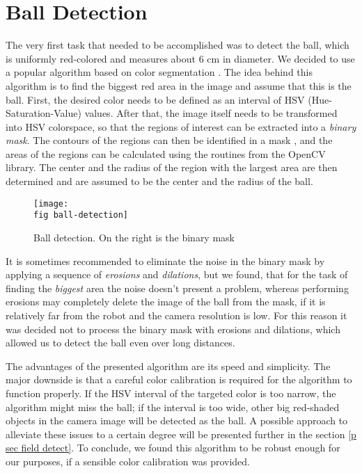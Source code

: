 \section{Ball Detection}
\label{p sec ball detection}

The very first task that needed to be accomplished was to detect the ball,
which is uniformly red-colored and measures about 6 cm in diameter. We decided
to use a popular algorithm based on color segmentation \cite{ball-detect}. The
idea behind this algorithm is to find the biggest red area in the image and
assume that this is the ball. First, the desired color needs to be defined as
an interval of HSV (Hue-Saturation-Value) \cite{hsv} values. After that, the
image itself needs to be transformed into HSV colorspace, so that the regions
of interest can be extracted into a \textit{binary mask}. The contours of the
regions can then be identified in a mask \cite{contours}, and the areas of the
regions can be calculated using the routines from the OpenCV library. The
center and the radius of the region with the largest area are then determined
and are assumed to be the center and the radius of the ball.

\begin{figure}[ht]
  \texttt{[image: \\fig ball-detection]}
  \caption[Ball detection]{Ball detection. On the right is the binary mask}
  \label{p figure ball-detection}
\end{figure}

It is sometimes recommended \cite{ball-detect} to eliminate the noise in the
binary mask by applying a sequence of \textit{erosions} and \textit{dilations},
but we found, that for the task of finding the \textit{biggest} area the noise
doesn't present a problem, whereas performing erosions may completely delete
the image of the ball from the mask, if it is relatively far from the robot and
the camera resolution is low. For this reason it was decided not to process the
binary mask with erosions and dilations, which allowed us to detect the ball
even over long distances.

The advantages of the presented algorithm are its speed and simplicity. The
major downside is that a careful color calibration is required for the
algorithm to function properly. If the HSV interval of the targeted color is
too narrow, the algorithm might miss the ball; if the interval is too
wide, other big red-shaded objects in the camera image will be detected as
the ball. A possible approach to alleviate these issues to a certain degree
will be presented further in the section \ref{p sec field detect}. To
conclude, we found this algorithm to be robust enough for our purposes, if a
sensible color calibration was provided.
